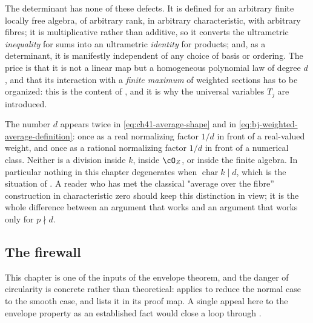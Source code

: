 The determinant has none of these defects.  It is defined for an arbitrary
finite locally free algebra, of arbitrary rank, in arbitrary
characteristic, with arbitrary fibres; it is multiplicative rather than
additive, so it converts the ultrametric \emph{inequality} for sums into an
ultrametric \emph{identity} for products; and, as a determinant, it is
manifestly independent of any choice of basis or ordering.  The price is
that it is not a linear map but a homogeneous polynomial law of degree
$d$, and that its interaction with a \emph{finite maximum} of weighted
sections has to be organized: this is the content of
, and it is why the universal
variables $T_j$ are introduced.

\begin{remark}
\label{rem:ch41-division-by-d}
The number $d$ appears twice in \eqref{eq:ch41-average-shape} and in
\eqref{eq:bj-weighted-average-definition}: once as a real normalizing factor
$1/d$ in front of a real-valued weight, and once as a rational
normalizing factor $1/d$ in front of a numerical class.  Neither is a
division inside $k$, inside $\cO_Z$, or inside the finite algebra.  In
particular nothing in this chapter degenerates when
$\operatorname{char}k\mid d$, which is the situation of
.  A reader who has met the classical
"average over the fibre'' construction in characteristic zero should keep
this distinction in view; it is the whole difference between an argument
that works and an argument that works only for $p\nmid d$.
\end{remark}

\subsection{The firewall}
\label{sec:ch41-firewall}

This chapter is one of the inputs of the envelope theorem, and the danger of
circularity is concrete rather than theoretical: 
applies  to reduce the normal case to the
smooth case, and  lists it in its proof map.
A single appeal here to the envelope property as an established fact would
close a loop through .

